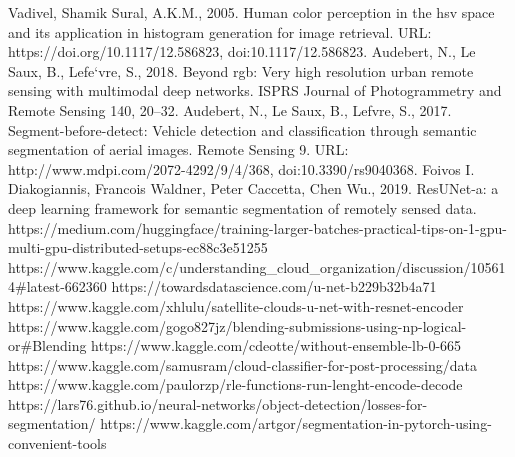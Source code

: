 \documentclass[UTF8]{article}
\begin{document}
\begin{thebibliography}{8}
\bibitem{} Vadivel, Shamik Sural, A.K.M., 2005. Human color perception in the hsv space and its application in histogram generation for image retrieval. URL: https://doi.org/10.1117/12.586823, doi:10.1117/12.586823.
\bibitem{} Audebert, N., Le Saux, B., Lefe`vre, S., 2018. Beyond rgb: Very high resolution urban remote sensing with multimodal deep networks. ISPRS Journal of Photogrammetry and Remote Sensing 140, 20–32.
\bibitem{} Audebert, N., Le Saux, B., Lefvre, S., 2017. Segment-before-detect: Vehicle detection and classification through semantic segmentation of aerial images. Remote Sensing 9. URL: http://www.mdpi.com/2072-4292/9/4/368, doi:10.3390/rs9040368.
\bibitem{} Foivos I. Diakogiannis, Francois Waldner, Peter Caccetta, Chen Wu., 2019. ResUNet-a: a deep learning framework for semantic segmentation of remotely sensed data.
\bibitem https://medium.com/huggingface/training-larger-batches-practical-tips-on-1-gpu-multi-gpu-distributed-setups-ec88c3e51255
https://www.kaggle.com/c/understanding\_cloud\_organization/discussion/105614\#latest-662360
\bibitem{} https://towardsdatascience.com/u-net-b229b32b4a71
\bibitem{} https://www.kaggle.com/xhlulu/satellite-clouds-u-net-with-resnet-encoder
\bibitem{} https://www.kaggle.com/gogo827jz/blending-submissions-using-np-logical-or\#Blending
\bibitem{} https://www.kaggle.com/cdeotte/without-ensemble-lb-0-665
\bibitem{} https://www.kaggle.com/samusram/cloud-classifier-for-post-processing/data
\bibitem{} https://www.kaggle.com/paulorzp/rle-functions-run-lenght-encode-decode
\bibitem{} https://lars76.github.io/neural-networks/object-detection/losses-for-segmentation/
\bibitem{} https://www.kaggle.com/artgor/segmentation-in-pytorch-using-convenient-tools
\end{thebibliography}
\end{document}
